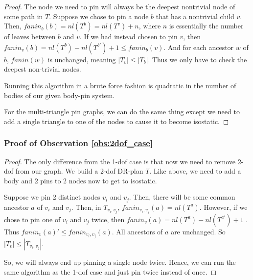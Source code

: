 \begin{proof}

    The node we need to pin will always be the deepest nontrivial node of some path in $T$. Suppose we chose to pin a node $b$ that has a nontrivial child $v$. Then, $fanin_b(b) = nl(T^b) = nl(T^v) + n$, where $n$ is essentially the number of leaves between $b$ and $v$. If we had instead chosen to pin $v$, then $fanin_v(b) = nl(T^b) - nl(T^{b'}) + 1 \leq fanin_b(v)$. And for each ancestor $w$ of $b$, $fanin(w)$ is unchanged, meaning $|T_v| \leq |T_b|$. Thus we only have to check the deepest non-trivial nodes.

    Running this algorithm in a brute force fashion is quadratic in the number of bodies of our given body-pin system.

    For the multi-triangle pin graphs, we can do the same thing except we need to add a single triangle to one of the nodes to cause it to become isostatic.
\end{proof}

\subsubsection{Proof of Observation \ref{obs:2dof_case}}
\begin{proof}
    The only difference from the 1-dof case is that now we need to remove 2-dof from our graph. We build a 2-dof DR-plan $T$. Like above, we need to add a body and 2 pins to 2 nodes now to get to isostatic.

    Suppose we pin 2 distinct nodes $v_i$ and $v_j$. Then, there will be some common ancestor $a$ of $v_i$ and $v_j$. Then, in $T_{v_i,v_j}$, $fanin_{v_i,v_j}(a) = nl(T^a)$. However, if we chose to pin one of $v_i$ and $v_j$ twice, then $fanin_v(a) = nl(T^a) - nl(T^{a'}) +1$ . Thus $fanin_v(a)' \leq fanin_{v_i,v_j}(a)$. All ancestors of $a$ are unchanged. So $|T_v| \leq |T_{v_i,v_j}|$.

    So, we will always end up pinning a single node twice. Hence, we can run the same algorithm as the 1-dof case and just pin twice instead of once.
\end{proof}

